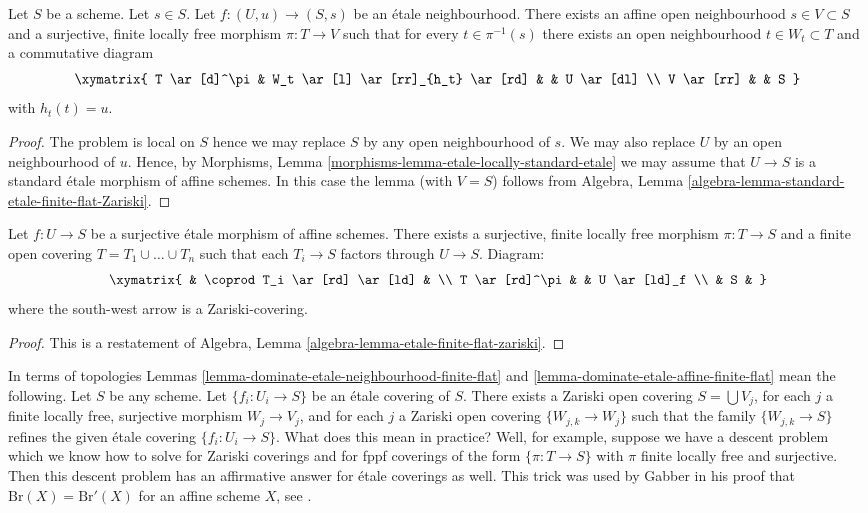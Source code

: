 \begin{lemma}
\label{lemma-dominate-etale-neighbourhood-finite-flat}
Let $S$ be a scheme. Let $s \in S$.
Let $f : (U, u) \to (S, s)$ be an \'etale neighbourhood.
There exists an affine open neighbourhood $s \in V \subset S$
and a surjective, finite locally free morphism $\pi : T \to V$
such that for every $t \in \pi^{-1}(s)$ there exists an
open neighbourhood $t \in W_t \subset T$ and a commutative
diagram
$$
\xymatrix{
T \ar[d]^\pi & W_t \ar[l] \ar[rr]_{h_t} \ar[rd] & & U \ar[dl] \\
V \ar[rr] & & S
}
$$
with $h_t(t) = u$.
\end{lemma}

\begin{proof}
The problem is local on $S$ hence we may replace $S$ by any
open neighbourhood of $s$.
We may also replace $U$ by an open neighbourhood of $u$.
Hence, by Morphisms, Lemma \ref{morphisms-lemma-etale-locally-standard-etale}
we may assume that
$U \to S$ is a standard \'etale morphism of affine schemes.
In this case the lemma (with $V = S$) follows from
Algebra, Lemma \ref{algebra-lemma-standard-etale-finite-flat-Zariski}.
\end{proof}

\begin{lemma}
\label{lemma-dominate-etale-affine-finite-flat}
Let $f : U \to S$ be a surjective \'etale morphism of affine schemes.
There exists a surjective, finite locally free morphism
$\pi : T \to S$ and a finite open covering
$T = T_1 \cup \ldots \cup T_n$ such that each
$T_i \to S$ factors through $U \to S$. Diagram:
$$
\xymatrix{
& \coprod T_i  \ar[rd] \ar[ld] & \\
T \ar[rd]^\pi & & U \ar[ld]_f \\
& S &
}
$$
where the south-west arrow is a Zariski-covering.
\end{lemma}

\begin{proof}
This is a restatement of
Algebra, Lemma \ref{algebra-lemma-etale-finite-flat-zariski}.
\end{proof}

\begin{remark}
\label{remark-topologies}
In terms of topologies
Lemmas \ref{lemma-dominate-etale-neighbourhood-finite-flat} and
\ref{lemma-dominate-etale-affine-finite-flat} mean the following.
Let $S$ be any scheme. Let $\{f_i : U_i \to S\}$ be an \'etale covering
of $S$. There exists a Zariski open covering $S = \bigcup V_j$,
for each $j$ a finite locally free, surjective morphism
$W_j \to V_j$, and for each $j$ a Zariski open covering
$\{W_{j, k} \to W_j\}$ such that the family
$\{W_{j, k} \to S\}$ refines the given \'etale covering
$\{f_i : U_i \to S\}$. What does this mean in practice?
Well, for example, suppose we have a descent problem which we
know how to solve for Zariski coverings and for fppf coverings
of the form $\{\pi : T \to S\}$ with $\pi$ finite locally free
and surjective. Then this descent problem has an affirmative
answer for \'etale coverings as well. This trick was used by
Gabber in his proof that $\text{Br}(X) = \text{Br}'(X)$
for an affine scheme $X$, see \cite{Hoobler}.
\end{remark}




